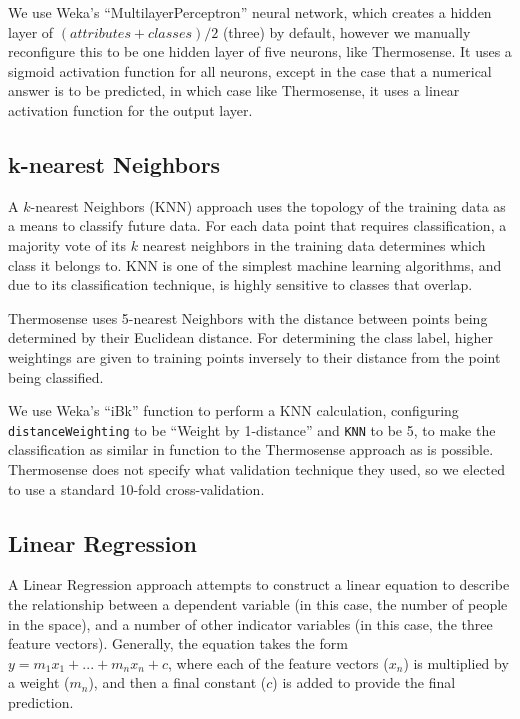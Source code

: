 \documentclass[../thesis/thesis.tex]{subfiles}
\begin{document}
We use Weka's ``MultilayerPerceptron'' neural network, which creates a hidden layer of $(\mathit{attributes} + \mathit{classes}) / 2$ (three) by default, however we manually reconfigure this to be one hidden layer of five neurons, like Thermosense. It uses a sigmoid activation function for all neurons, except in the case that a numerical answer is to be predicted, in which case like Thermosense, it uses a linear activation function for the output layer.

\subsection{k-nearest Neighbors}
A $k$-nearest Neighbors (KNN) approach uses the topology of the training data as a means to classify future data. For each data point that requires classification, a majority vote of its $k$ nearest neighbors in the training data determines which class it belongs to. KNN is one of the simplest machine learning algorithms, and due to its classification technique, is highly sensitive to classes that overlap. 

Thermosense uses 5-nearest Neighbors with the distance between points being determined by their Euclidean distance. For determining the class label, higher weightings are given to training points inversely to their distance from the point being classified.

We use Weka's ``iBk'' function to perform a KNN calculation, configuring \texttt{distanceWeighting} to be ``Weight by 1-distance'' and \texttt{KNN} to be 5, to make the classification as similar in function to the Thermosense approach as is possible. Thermosense does not specify what validation technique they used, so we elected to use a standard 10-fold cross-validation.

\subsection{Linear Regression}
A Linear Regression approach attempts to construct a linear equation to describe the relationship between a dependent variable (in this case, the number of people in the space), and a number of other indicator variables (in this case, the three feature vectors). Generally, the equation takes the form $y = m_1x_1 + ... + m_nx_n + c$, where each of the feature vectors ($x_n$) is multiplied by a weight ($m_n$), and then a final constant ($c$) is added to provide the final prediction.
\end{document}

